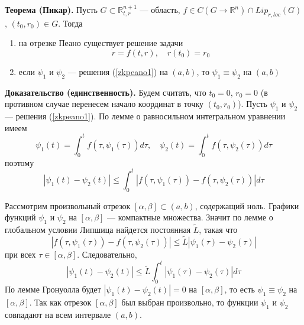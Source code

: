 \noindent \textbf{Теорема (Пикар).} Пусть $G \subset \mathbb{R}_{t,r}^{n+1}$ --- область, $f \in C(G \to \mathbb{R}^n) \cap Lip_{r,loc}(G)$, $(t_0, r_0) \in G$. Тогда
\begin{enumerate}
    \item на отрезке Пеано существует решение задачи
    \begin{equation}
        \dot{r} = f(t,r), \quad r(t_0) = r_0 \label{zkpeano1}
    \end{equation}
    \item если $\psi_1$ и $\psi_2$ --- решения (\ref{zkpeano1}) на $(a,b)$, то $\psi_1 \equiv \psi_2$ на $(a,b)$
\end{enumerate}
\textbf{Доказательство (единственность).} Будем считать, что $t_0 = 0$, $r_0 = 0$ (в противном случае перенесем начало координат в точку $(t_0, r_0)$). Пусть $\psi_1$ и $\psi_2$ --- решения (\ref{zkpeano1}). По лемме о равносильном интегральном уравнении имеем
\begin{equation*}
    \psi_1(t) = \int_0^t f(\tau, \psi_1(\tau))d\tau, \quad \psi_2(t) = \int_0^t f(\tau, \psi_2(\tau))d\tau
\end{equation*}
поэтому
\begin{equation*}
    |\psi_1(t) - \psi_2(t)| \le \int_0^t |f(\tau, \psi_1(\tau)) - f(\tau, \psi_2(\tau))|d\tau
\end{equation*}

Рассмотрим произвольный отрезок $[\alpha, \beta] \subset (a,b)$, содержащий ноль. Графики функций $\psi_1$ и $\psi_2$ на $[\alpha, \beta]$ --- компактные множества. Значит по лемме о глобальном условии Липшица найдется постоянная $\widetilde{L}$, такая что
\begin{equation*}
    |f(\tau, \psi_1(\tau)) - f(\tau, \psi_2(\tau))| \le \widetilde{L}|\psi_1(\tau) - \psi_2(\tau)|
\end{equation*}
при всех $\tau \in [\alpha,\beta]$. Следовательно,
\begin{equation*}
    |\psi_1(t) - \psi_2(t)| \le \widetilde{L} \int_0^t |\psi_1(\tau) - \psi_2(\tau)|d\tau
\end{equation*}
По лемме Гронуолла будет $|\psi_1(t) - \psi_2(t)| = 0$ на $[\alpha, \beta]$, то есть $\psi_1 \equiv \psi_2$ на $[\alpha,\beta]$. Так как отрезок $[\alpha, \beta]$ был выбран произвольно, то функции $\psi_1$ и $\psi_2$ совпадают на всем интервале $(a,b)$.
